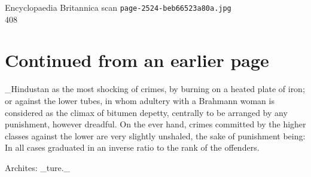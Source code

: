 \documentclass{article}
\begin{document}
\begin{center}
{\Large Encyclopaedia Britannica scan \texttt{page-2524-beb66523a80a.jpg}}\\[0.5em]
408
\end{center}
\section*{Continued from an earlier page}
\_Hindustan as the most shocking of crimes, by burning on a heated plate of iron; or against the lower tubes, in whom adultery with a Brahmann woman is considered as the climax of bitumen depetty, centrally to be arranged by any punishment, however dreadful. On the ever hand, crimes committed by the higher classes against the lower are very slightly unshaled, the sake of punishment being: In all cases graduated in an inverse ratio to the rank of the offenders.

Archites: \_ture.\_
\end{document}
